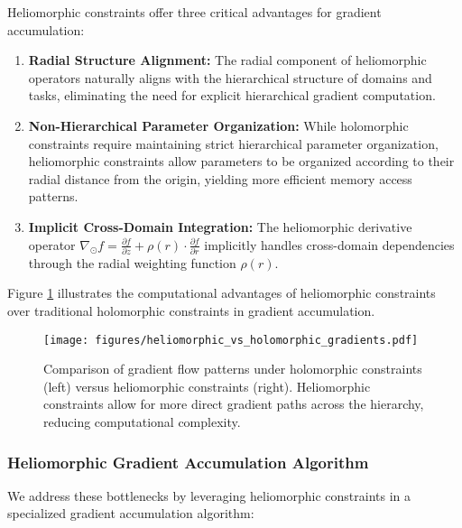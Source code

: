 Heliomorphic constraints offer three critical advantages for gradient accumulation:

\begin{enumerate}
    \item \textbf{Radial Structure Alignment:} The radial component of heliomorphic operators naturally aligns with the hierarchical structure of domains and tasks, eliminating the need for explicit hierarchical gradient computation.
    
    \item \textbf{Non-Hierarchical Parameter Organization:} While holomorphic constraints require maintaining strict hierarchical parameter organization, heliomorphic constraints allow parameters to be organized according to their radial distance from the origin, yielding more efficient memory access patterns.
    
    \item \textbf{Implicit Cross-Domain Integration:} The heliomorphic derivative operator $\nabla_{\odot} f = \frac{\partial f}{\partial z} + \rho(r) \cdot \frac{\partial f}{\partial r}$ implicitly handles cross-domain dependencies through the radial weighting function $\rho(r)$.
\end{enumerate}

Figure \ref{fig:gradient_comparison} illustrates the computational advantages of heliomorphic constraints over traditional holomorphic constraints in gradient accumulation.

\begin{figure}[h]
\centering
\texttt{[image: figures/heliomorphic\_vs\_holomorphic\_gradients.pdf]}
\caption{Comparison of gradient flow patterns under holomorphic constraints (left) versus heliomorphic constraints (right). Heliomorphic constraints allow for more direct gradient paths across the hierarchy, reducing computational complexity.}
\label{fig:gradient_comparison}
\end{figure}

\subsubsection{Heliomorphic Gradient Accumulation Algorithm}

We address these bottlenecks by leveraging heliomorphic constraints in a specialized gradient accumulation algorithm:

